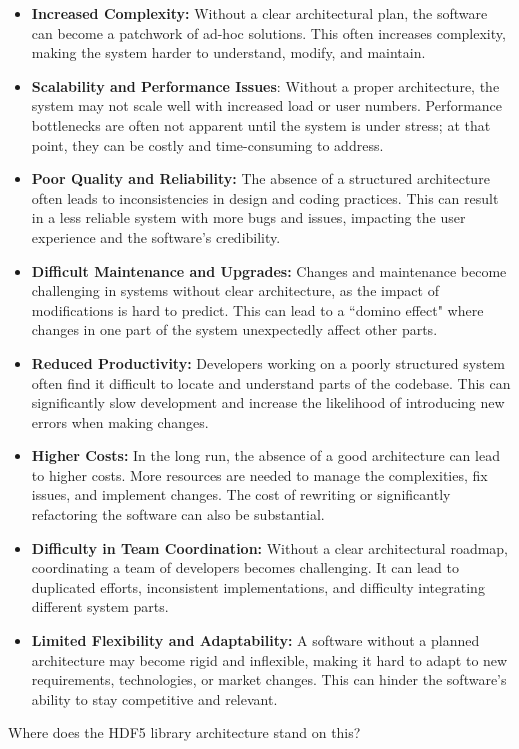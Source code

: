 \begin{itemize}
    \item \textbf{Increased Complexity:} Without a clear architectural plan, the software can become a patchwork of ad-hoc solutions. This often increases complexity, making the system harder to understand, modify, and maintain.
    \item \textbf{Scalability and Performance Issues}: Without a proper architecture, the system may not scale well with increased load or user numbers. Performance bottlenecks are often not apparent until the system is under stress; at that point, they can be costly and time-consuming to address.
    \item \textbf{Poor Quality and Reliability:} The absence of a structured architecture often leads to inconsistencies in design and coding practices. This can result in a less reliable system with more bugs and issues, impacting the user experience and the software's credibility.
    \item \textbf{Difficult Maintenance and Upgrades:} Changes and maintenance become challenging in systems without clear architecture, as the impact of modifications is hard to predict. This can lead to a ``domino effect" where changes in one part of the system unexpectedly affect other parts.
    \item \textbf{Reduced Productivity:} Developers working on a poorly structured system often find it difficult to locate and understand parts of the codebase. This can significantly slow development and increase the likelihood of introducing new errors when making changes.
    \item \textbf{Higher Costs:} In the long run, the absence of a good architecture can lead to higher costs. More resources are needed to manage the complexities, fix issues, and implement changes. The cost of rewriting or significantly refactoring the software can also be substantial.
    \item \textbf{Difficulty in Team Coordination:} Without a clear architectural roadmap, coordinating a team of developers becomes challenging. It can lead to duplicated efforts, inconsistent implementations, and difficulty integrating different system parts.
    \item \textbf{Limited Flexibility and Adaptability:} A software without a planned architecture may become rigid and inflexible, making it hard to adapt to new requirements, technologies, or market changes. This can hinder the software's ability to stay competitive and relevant.
\end{itemize}

Where does the HDF5 library architecture stand on this?
